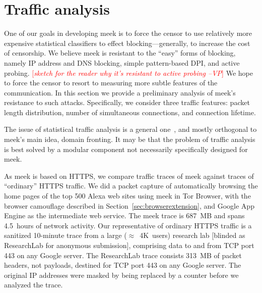 \documentclass{sig-alternate}
\newcommand{\meekclient}{\mbox{meek-client}\xspace}
\newcommand{\meek}{meek\xspace}
\newcommand{\lbl}{ResearchLab\xspace}
\newcommand{\note}[1]{{\textcolor{red}{[\textit{#1}]}}}
\newcommand{\vp}[1]{\note{#1 --VP}}
\begin{document}


\section{Traffic analysis}
\label{sec:trafficanalysis}

One of our goals in developing \meek is to force
the censor to use relatively more expensive statistical classifiers
to effect blocking---generally, to increase the cost of censorship.
We believe \meek is resistant to the ``easy''
forms of blocking, namely IP address and DNS blocking,
simple pattern-based DPI,
and active probing.
\vp{sketch for the reader why it's resistant to active probing}
We hope to force the censor to resort to measuring
more subtle features of the communication.
In this section we provide a preliminary analysis
of \meek's resistance to such attacks.
Specifically, we consider three traffic features:
packet length distribution,
number of simultaneous connections,
and connection lifetime.

The issue of statistical traffic analysis is a general one~\cite{trafficmorphing},
and mostly orthogonal to \meek's main idea, domain fronting.
It may be that the problem of traffic analysis is
best solved by a modular component not
necessarily specifically designed for \meek.

As \meek is based on HTTPS,
we compare traffic traces of \meek against
traces of ``ordinary'' HTTPS traffic.
We did a packet capture
of automatically browsing the home pages
of the top 500 Alexa web sites using \meek in Tor Browser,
with the browser camouflage described in Section~\ref{sec:browserextension},
and Google App Engine as the intermediate web service.
The \meek trace is 687~MB
and spans 4.5~hours of network activity.
Our representative of ordinary HTTPS traffic
is a sanitized 10-minute trace
from 
a large ($\approx$~4K~users)
research lab [blinded as \lbl for anonymous submission],
comprising data to and from TCP port 443 on any Google server.
The \lbl trace consists 313~MB of packet headers,
not payloads, destined for TCP port 443 on any Google server.
The original IP addresses were masked by being
replaced by a counter before we analyzed the trace.
\end{document}
